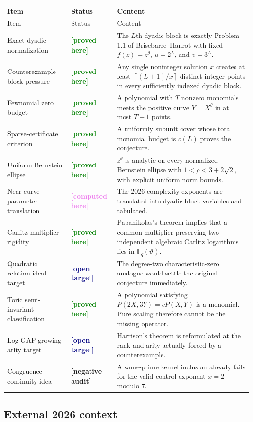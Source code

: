 \documentclass[11pt,oneside]{article}
\theoremstyle{definition}
\theoremstyle{remark}
\newcommand{\Fq}{\mathbb F_q}
\newcommand{\tht}{\theta}
\newcommand{\ceil}[1]{\left\lceil#1\right\rceil}
\newcommand{\statusproved}{\textcolor{green}{\textbf{[proved here]}}}
\newcommand{\statuscomputed}{\textcolor{violet}{\textbf{[computed here]}}}
\newcommand{\statustarget}{\textcolor{navy}{\textbf{[open target]}}}
\newcommand{\statusnegative}{\textcolor{brick}{\textbf{[negative audit]}}}
\begin{document}
\begin{longtable}{L{0.28\textwidth}L{0.18\textwidth}L{0.44\textwidth}}
\toprule
Item & Status & Content \\
\midrule
\endfirsthead
\toprule
Item & Status & Content \\
\midrule
\endhead
Exact dyadic normalization & \statusproved & The $L$th dyadic block is exactly Problem 1.1 of Brisebarre--Hanrot with fixed $f(z)=z^{\tht}$, $u=2^L$, and $v=3^L$. \\
Counterexample block pressure & \statusproved & Any single noninteger solution $x$ creates at least $\ceil{(L+1)/x}$ distinct integer points in every sufficiently indexed dyadic block. \\
Fewnomial zero budget & \statusproved & A polynomial with $T$ nonzero monomials meets the positive curve $Y=X^{\tht}$ in at most $T-1$ points. \\
Sparse-certificate criterion & \statusproved & A uniformly subunit cover whose total monomial budget is $o(L)$ proves the conjecture. \\
Uniform Bernstein ellipse & \statusproved & $z^{\tht}$ is analytic on every normalized Bernstein ellipse with $1<\rho<3+2\sqrt2$, with explicit uniform norm bounds. \\
Near-curve parameter translation & \statuscomputed & The 2026 complexity exponents are translated into dyadic-block variables and tabulated. \\
Carlitz multiplier rigidity & \statusproved & Papanikolas's theorem implies that a common multiplier preserving two independent algebraic Carlitz logarithms lies in $\Fq(\vartheta)$. \\
Quadratic relation-ideal target & \statustarget & The degree-two characteristic-zero analogue would settle the original conjecture immediately. \\
Toric semi-invariant classification & \statusproved & A polynomial satisfying $P(2X,3Y)=cP(X,Y)$ is a monomial.  Pure scaling therefore cannot be the missing operator. \\
Log-GAP growing-arity target & \statustarget & Harrison's theorem is reformulated at the rank and arity actually forced by a counterexample. \\
Congruence-continuity idea & \statusnegative & A same-prime kernel inclusion already fails for the valid control exponent $x=2$ modulo $7$. \\
\bottomrule
\end{longtable}

\subsection{External 2026 context}
\end{document}
